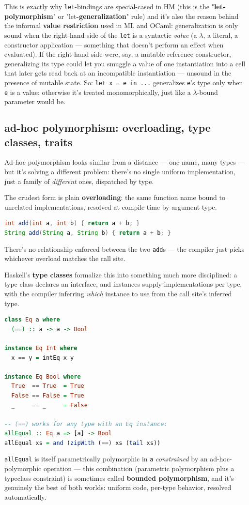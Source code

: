 This is exactly why \lstinline|let|-bindings are special-cased in HM (this is the "\textbf{let-polymorphism}" or "\textbf{$\mathrm{let}$-generalization}" rule) and it's also the reason behind the informal \textbf{value restriction} used in ML and OCaml: generalization is only sound when the right-hand side of the \lstinline|let| is a syntactic \emph{value} (a $\lambda$, a literal, a constructor application — something that doesn't perform an effect when evaluated). If the right-hand side were, say, a mutable reference constructor, generalizing its type could let you smuggle a value of one instantiation into a cell that later gets read back at an incompatible instantiation — unsound in the presence of mutable state. So: \lstinline|let x = e in ...| generalizes \lstinline|e|'s type only when \lstinline|e| is a value; otherwise it's treated monomorphically, just like a $\lambda$-bound parameter would be.

\subsection{ad-hoc polymorphism: overloading, type classes, traits}

Ad-hoc polymorphism looks similar from a distance — one name, many types — but it's solving a different problem: there's no single uniform implementation, just a family of \emph{different} ones, dispatched by type.

The crudest form is plain \textbf{overloading}: the same function name bound to unrelated implementations, resolved at compile time by argument type.
\begin{lstlisting}[language=Java]
int add(int a, int b) { return a + b; }
String add(String a, String b) { return a + b; }
\end{lstlisting}
There's no relationship enforced between the two \lstinline|add|s — the compiler just picks whichever overload matches the call site.

Haskell's \textbf{type classes} formalize this into something much more disciplined: a type class declares an interface, and instances supply implementations per type, with the compiler inferring \emph{which} instance to use from the call site's inferred type.
\begin{lstlisting}[language=Haskell]
class Eq a where
  (==) :: a -> a -> Bool

instance Eq Int where
  x == y = intEq x y

instance Eq Bool where
  True  == True  = True
  False == False = True
  _     == _     = False

-- (==) works for any type with an Eq instance:
allEqual :: Eq a => [a] -> Bool
allEqual xs = and (zipWith (==) xs (tail xs))
\end{lstlisting}
\lstinline|allEqual| is itself parametrically polymorphic in \lstinline|a| \emph{constrained} by an ad-hoc-polymorphic operation — this combination (parametric polymorphism plus a typeclass constraint) is sometimes called \textbf{bounded polymorphism}, and it's genuinely the best of both worlds: uniform code, per-type behavior, resolved automatically.

